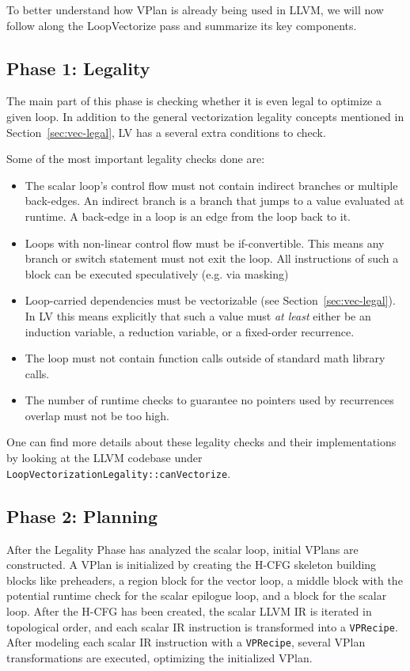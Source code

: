 \documentclass[sigplan,11pt,nonacm]{acmart}
\begin{document}
To better understand how VPlan is already being used in LLVM, we will now follow along the 
LoopVectorize pass and summarize its key components.

\subsection{Phase 1: Legality}
The main part of this phase is checking whether it is even legal to optimize a given loop. 
In addition to the general vectorization legality concepts mentioned in 
Section~\ref{sec:vec-legal}, LV has a several extra conditions to check.

Some of the most important legality checks done are:
\begin{itemize}
  \item The scalar loop's control flow must not contain indirect branches or multiple back-edges.
  An indirect branch is a branch that jumps to a value evaluated at runtime. A back-edge in a loop 
  is an edge from the loop back to it. 
  \item Loops with non-linear control flow must be if-convertible. This means any branch or switch 
  statement must not exit the loop. All instructions of such a block can be executed speculatively 
  (e.g. via masking)
  \item Loop-carried dependencies must be vectorizable (see Section~\ref{sec:vec-legal}). In LV 
  this means explicitly that such a value must \textit{at least} either be an induction variable, a reduction 
  variable, or a fixed-order recurrence.
  \item The loop must not contain function calls outside of standard math library calls.
  \item The number of runtime checks to guarantee no pointers used by recurrences overlap must not be too high.
\end{itemize}

One can find more details about these legality checks and their implementations by looking 
at the LLVM codebase under \texttt{LoopVectorizationLegality::\allowbreak canVectorize}.

\subsection{Phase 2: Planning}
After the Legality Phase has analyzed the scalar loop, initial VPlans are constructed.
A VPlan is initialized by creating the H-CFG skeleton building blocks like preheaders, a 
region block for the vector loop, a middle block with the potential runtime check for the scalar 
epilogue loop, and a block for the scalar loop. After the H-CFG has been created, the scalar LLVM IR 
is iterated in topological order, and each scalar IR instruction is transformed into a \texttt{VPRecipe}.
After modeling each scalar IR instruction with a \texttt{VPRecipe}, several VPlan transformations 
are executed, optimizing the initialized VPlan.
\end{document}
